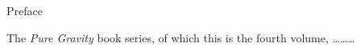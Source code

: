 \newpage           %
\thispagestyle{empty}      %
\mbox{}                    %
\newpage                   %



\begin{center}
{\lgb Preface}
\end{center}

The {\it Pure Gravity} book series, of which this is the fourth volume,
\dots\dots\dots


\tableofcontents

\listoffigures

